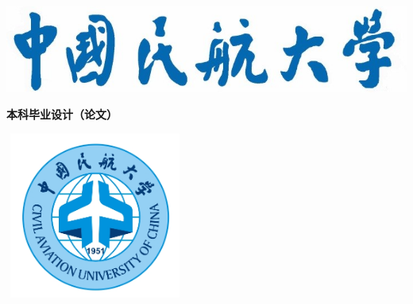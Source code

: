 \begin{titlepage}
    \setlength{\headsep}{1.3cm}
    {
    
              \begin{center}
              \includegraphics[]{./pic/pic1.jpg}
              \end{center}
    }
              \vspace{-12mm}
            \begin{center}
                \setlength{\baselineskip}{0pt}\bfseries\fakeli {}本科毕业设计（论文）
            \end{center}
    
            \vspace{-3.8mm}
              \begin{center}
              \includegraphics[height=5.45cm,width=5.9cm]{./pic/pic2.png}
              \end{center}
            \vspace{-1pt}
            \begin{center}\fakehei{}\Title \end{center}
            \vspace{8ex}
    

\end{titlepage}
